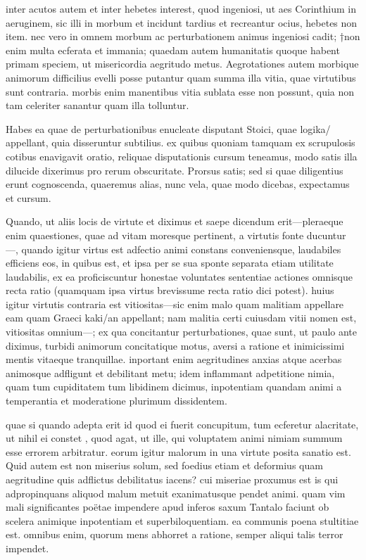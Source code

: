  inter acutos autem et inter hebetes interest, quod ingeniosi, ut aes Corinthium in aeruginem, sic illi in morbum et incidunt tardius et recreantur ocius, hebetes non item. nec vero in omnem morbum ac perturbationem animus ingeniosi cadit; †non enim multa ecferata et immania; quaedam autem humanitatis quoque habent primam speciem, ut misericordia aegritudo metus. Aegrotationes autem morbique animorum difficilius evelli posse putantur quam summa illa vitia, quae virtutibus sunt contraria. morbis enim manentibus vitia sublata esse non possunt, quia non tam celeriter sanantur quam illa tolluntur.

 Habes ea quae de perturbationibus enucleate disputant Stoici, quae logika/ appellant, quia disseruntur subtilius. ex quibus quoniam tamquam ex scrupulosis cotibus enavigavit oratio, reliquae disputationis cursum teneamus, modo satis illa dilucide dixerimus pro rerum obscuritate. Prorsus satis; sed si quae diligentius erunt cognoscenda, quaeremus alias, nunc vela, quae modo dicebas, expectamus et cursum.

 Quando, ut aliis locis de virtute et diximus et saepe dicendum erit—pleraeque enim quaestiones, quae ad vitam moresque pertinent, a virtutis fonte ducuntur —, quando igitur virtus est adfectio animi constans conveniensque, laudabiles efficiens eos, in quibus est, et ipsa per se sua sponte separata etiam utilitate laudabilis, ex ea proficiscuntur honestae voluntates sententiae actiones omnisque recta ratio (quamquam ipsa virtus brevissume recta ratio dici potest). huius igitur virtutis contraria est vitiositas—sic enim malo quam malitiam appellare eam quam Graeci kaki/an appellant; nam malitia certi cuiusdam vitii nomen est, vitiositas omnium—; ex qua concitantur perturbationes, quae sunt, ut paulo ante diximus, turbidi animorum concitatique motus, aversi a ratione et inimicissimi mentis vitaeque tranquillae. inportant enim aegritudines anxias atque acerbas animosque adfligunt et debilitant metu; idem inflammant adpetitione nimia, quam tum cupiditatem tum libidinem dicimus, inpotentiam quandam animi a temperantia et moderatione plurimum dissidentem.

 quae si quando adepta erit id quod ei fuerit concupitum, tum ecferetur alacritate, ut nihil ei constet , quod agat, ut ille, qui voluptatem animi nimiam summum esse errorem arbitratur. eorum igitur malorum in una virtute posita sanatio est. Quid autem est non miserius solum, sed foedius etiam et deformius quam aegritudine quis adflictus debilitatus iacens? cui miseriae proxumus est is qui adpropinquans aliquod malum metuit exanimatusque pendet animi. quam vim mali significantes poëtae impendere apud inferos saxum Tantalo faciunt ob scelera animique inpotentiam et superbiloquentiam. ea communis poena stultitiae est. omnibus enim, quorum mens abhorret a ratione, semper aliqui talis terror impendet.


